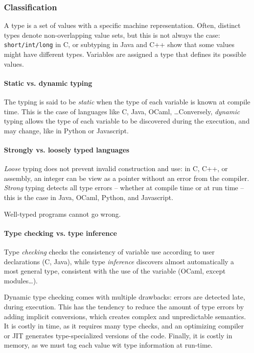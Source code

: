 \documentclass[toc, titlepaged]{../cs-classes/cs-classes}
\begin{document}
\subsubsection{Classification}
A type is a set of values with a specific machine representation. Often, distinct types denote non-overlapping value sets, but this is not always the case: \texttt{short/int/long} in C, or subtyping in Java and C++ show that some values might have different types. Variables are assigned a type that defines its possible values.

\paragraph*{Static vs. dynamic typing}
The typing is said to be \emph{static} when the type of each variable is known at compile time. This is the case of languages like C, Java, OCaml, \dots Conversely, \emph{dynamic} typing allows the type of each variable to be discovered during the execution, and may change, like in Python or Javascript.

\paragraph*{Strongly vs. loosely typed languages}
\emph{Loose} typing does not prevent invalid construction and use: in C, C++, or assembly, an integer can be view as a pointer without an error from the compiler. \emph{Strong} typing detects all type errors -- whether at compile time or at run time -- this is the case in Java, OCaml, Python, and Javascript.

\begin{theorem}
    Well-typed programs cannot go wrong.
\end{theorem}

\paragraph*{Type checking vs. type inference}
Type \emph{checking} checks the consistency of variable use according to user declarations (C, Java), while type \emph{inference} discovers almost automatically a most general type, consistent with the use of the variable (OCaml, except modules\dots).

\begin{example}
    Dynamic type checking comes with multiple drawbacks: errors are detected late, during execution. This has the tendency to reduce the amount of type errors by adding implicit conversions, which creates complex and unpredictable semantics. It is costly in time, as it requires many type checks, and an optimizing compiler or JIT generates type-specialized versions of the code. Finally, it is costly in memory, as we must tag each value wit type information at run-time.
\end{example}
\end{document}
